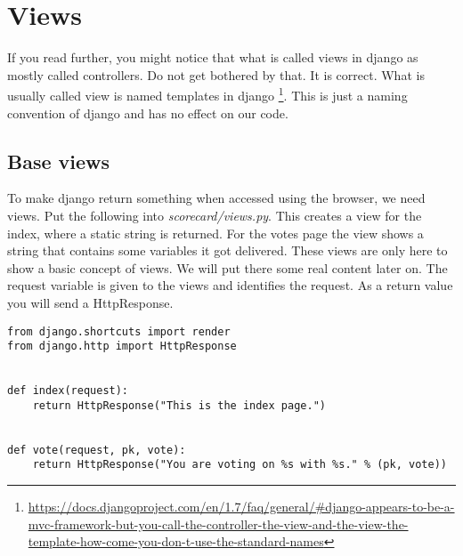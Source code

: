 \section{Views}

If you read further, you might notice that what is called views in django as mostly called controllers. Do not get bothered by that. It is correct. What is usually called view is named templates in django \footnote{\url{https://docs.djangoproject.com/en/1.7/faq/general/\#django-appears-to-be-a-mvc-framework-but-you-call-the-controller-the-view-and-the-view-the-template-how-come-you-don-t-use-the-standard-names}}. This is just a naming convention of django and has no effect on our code.

\subsection{Base views}
To make django return something when accessed using the browser, we need views. Put the following into \emph{scorecard/views.py}. This creates a view for the index, where a static string is returned. For the votes page the view shows a string that contains some variables it got delivered. These views are only here to show a basic concept of views. We will put there some real content later on. The request variable is given to the views and identifies the request. As a return value you will send a HttpResponse.

\begin{lstlisting}[style=Python, caption=scorecard/views.py, label=lst:views.py]
from django.shortcuts import render
from django.http import HttpResponse


def index(request):
    return HttpResponse("This is the index page.")


def vote(request, pk, vote):
    return HttpResponse("You are voting on %s with %s." % (pk, vote))
\end{lstlisting}

